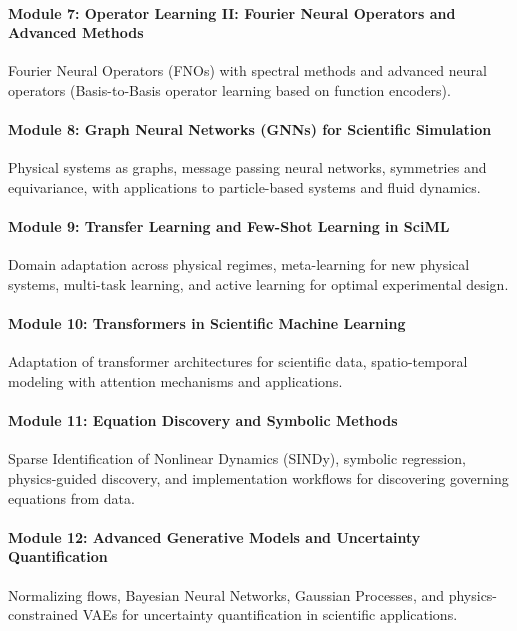 \documentclass[11pt,fourier]{article}
\begin{document}
	\paragraph{Module 7: Operator Learning II: Fourier Neural Operators and Advanced Methods}
	Fourier Neural Operators (FNOs) with spectral methods and advanced neural operators (Basis-to-Basis operator learning based on function encoders).
	
	\paragraph{Module 8: Graph Neural Networks (GNNs) for Scientific Simulation}
	Physical systems as graphs, message passing neural networks, symmetries and equivariance, with applications to particle-based systems and fluid dynamics.
	
	\paragraph{Module 9: Transfer Learning and Few-Shot Learning in SciML} Domain adaptation across physical regimes, meta-learning for new physical systems, multi-task learning, and active learning for optimal experimental design.
	
	\paragraph{Module 10: Transformers in Scientific Machine Learning} Adaptation of transformer architectures for scientific data, spatio-temporal modeling with attention mechanisms and applications.
	
	\paragraph{Module 11: Equation Discovery and Symbolic Methods}
	Sparse Identification of Nonlinear Dynamics (SINDy), symbolic regression, physics-guided discovery, and implementation workflows for discovering governing equations from data.
	
	\paragraph{Module 12: Advanced Generative Models and Uncertainty Quantification}
	Normalizing flows, Bayesian Neural Networks, Gaussian Processes, and physics-constrained VAEs for uncertainty quantification in scientific applications.
	
\end{document}
